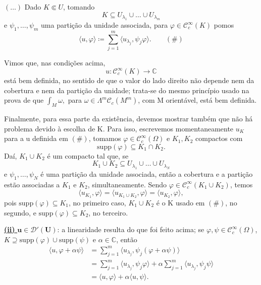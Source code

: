 \documentclass[../distribution_theory_notes.tex]{subfiles}
\begin{document}
\begin{proof*}
	\((\dotsc)\) Dado \(K\Subset U\), tomando
	\[
		K\subseteq U_{\lambda _1}\cup \dotsc \cup U_{\lambda _m}
	\]
	e \(\psi _1,\dotsc ,\psi _m\) uma partição da unidade associada, para \(\varphi \in \mathcal{C}_{c}^{\infty}(K)\) pomos
	\[
		\langle u,\varphi \rangle \coloneqq \sum\limits_{j=1}^{m}\langle u_{\lambda _j},\psi _j\varphi \rangle. \qquad (\#)
	\]

	Vimos que, nas condições acima,
	\[
		u:\mathcal{C}_{c}^{\infty}(K)\longrightarrow \mathbb{C}
	\]
	está bem definida, no sentido de que o valor do lado direito não depende nem da cobertura e nem da partição da unidade; trata-se do mesmo princípio usado na prova de que \(\int_{M}\omega,\) para \(\omega \in \Lambda^{m}\mathcal{C}_{c}(M^{m})\), com M orientável, está bem definida.

	Finalmente, para essa parte da existência, devemos mostrar também que não há problema devido à escolha de K. Para isso, escrevemos momentaneamente \(u_{K}\) para a u definida em \((\#)\), tomamos \(\varphi \in \mathcal{C}_{c}^{\infty}(\Omega )\) e \(K_{1},K_{2}\) compactos com
	\[
		\mathrm{supp}(\varphi )\subseteq K_{1}\cap K_{2}.
	\]
	Daí, \(K_{1}\cup K_{2}\) é um compacto tal que, se
	\[
		K_{1}\cup K_{2}\subseteq U_{\lambda _1}\cup \dotsc \cup U_{\lambda _N}
	\]
	e \(\psi _1,\dotsc ,\psi _N\) é uma partição da unidade associada, então a cobertura e a partição estão associadas a \(K_{1}\) e \(K_{2}\), simultaneamente. Sendo \(\varphi \in \mathcal{C}_{c}^{\infty}(K_{1}\cup K_{2})\), temos
	\[
		\langle u_{K_{1}},\varphi \rangle
		=
		\langle u_{K_{1}\cup K_{2}},\varphi \rangle
		=
		\langle u_{K_{2}},\varphi \rangle,
	\]
	pois \(\mathrm{supp}(\varphi )\subseteq K_{1}\), no primeiro caso, \(K_{1}\cup K_{2}\) é o K usado em \((\#)\), no segundo, e \(\mathrm{supp}(\varphi )\subseteq K_{2}\), no terceiro.

	\underline{\textbf{(ii)} \(\mathbf{u\in \mathcal{D}'(U)}\)}: a linearidade resulta do que foi feito acima; se \(\varphi ,\psi \in \mathcal{C}_{c}^{\infty}(\Omega )\), \(K\supseteq \mathrm{supp}(\varphi )\cup \mathrm{supp}(\psi )\) e \(\alpha \in \mathbb{C}\), então
	\begin{align*}
		\langle u,\varphi +\alpha \psi \rangle
		 & =\sum\limits_{j=1}^{m}\langle u_{\lambda _j},\psi _j(\varphi +\alpha \psi )\rangle \\
		 & =\sum\limits_{j=1}^{m}\langle u_{\lambda _j},\psi _j\varphi \rangle
		+\alpha \sum\limits_{j=1}^{m}\langle u_{\lambda _j},\psi _j\psi \rangle               \\
		 & =\langle u,\varphi \rangle+\alpha \langle u,\psi \rangle.
	\end{align*}


\end{proof*}
\end{document}
